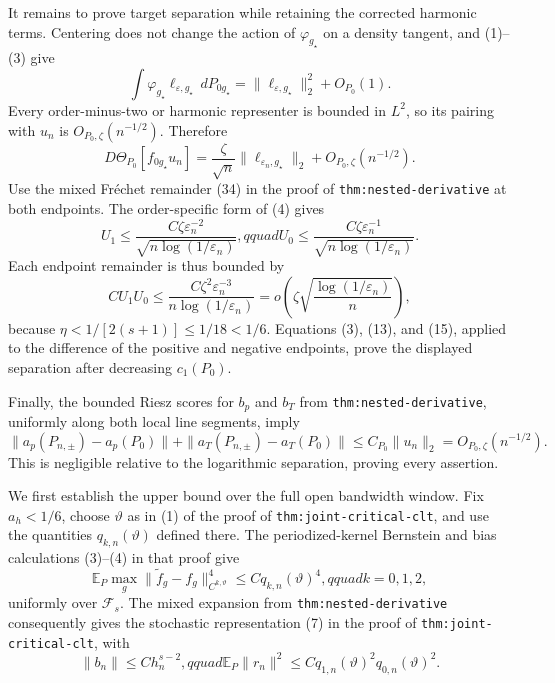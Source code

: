 It remains to prove target separation while retaining the corrected harmonic terms.  Centering does not change the action of \(\varphi_{g_\star}\) on a density tangent, and (1)--(3) give
\[
 \int\varphi_{g_\star}\ell_{\varepsilon,g_\star}\,dP_{0g_\star}
 =\|\ell_{\varepsilon,g_\star}\|_2^2+O_{P_0}(1).                    \tag{12}
\]
Every order-minus-two or harmonic representer is bounded in \(L^2\), so its pairing with \(u_n\) is \(O_{P_0,\zeta}(n^{-1/2})\).  Therefore
\[
 D\Theta_{P_0}[f_{0g_\star}u_n]
 =\frac{\zeta}{\sqrt n}\|\ell_{\varepsilon_n,g_\star}\|_2
 +O_{P_0,\zeta}(n^{-1/2}).                                             \tag{13}
\]
Use the mixed Fr\'echet remainder (34) in the proof of \texttt{thm:nested-derivative} at both endpoints.  The order-specific form of (4) gives
\[
 U_1\leq\frac{C\zeta\varepsilon_n^{-2}}
 {\sqrt{n\log(1/\varepsilon_n)}},qquad
 U_0\leq\frac{C\zeta\varepsilon_n^{-1}}
 {\sqrt{n\log(1/\varepsilon_n)}}.                                    \tag{14}
\]
Each endpoint remainder is thus bounded by
\[
 CU_1U_0\leq
 \frac{C\zeta^2\varepsilon_n^{-3}}
 {n\log(1/\varepsilon_n)}
 =o\!\left(\zeta\sqrt{\frac{\log(1/\varepsilon_n)}n}\right),        \tag{15}
\]
because \(\eta<1/[2(s+1)]\leq1/18<1/6\).  Equations (3), (13), and (15), applied to the difference of the positive and negative endpoints, prove the displayed separation after decreasing \(c_1(P_0)\).

Finally, the bounded Riesz scores for \(b_p\) and \(b_T\) from \texttt{thm:nested-derivative}, uniformly along both local line segments, imply
\[
 \|a_p(P_{n,\pm})-a_p(P_0)\|+
 \|a_T(P_{n,\pm})-a_T(P_0)\|
 \leq C_{P_0}\|u_n\|_2=O_{P_0,\zeta}(n^{-1/2}).                      \tag{16}
\]
This is negligible relative to the logarithmic separation, proving every assertion.

We first establish the upper bound over the full open bandwidth window.  Fix \(a_h<1/6\), choose \(\vartheta\) as in (1) of the proof of \texttt{thm:joint-critical-clt}, and use the quantities \(q_{k,n}(\vartheta)\) defined there.  The periodized-kernel Bernstein and bias calculations (3)--(4) in that proof give
\[
 \mathbb E_P\max_g\|\widetilde f_g-f_g\|_{C^{k,\vartheta}}^4
 \leq Cq_{k,n}(\vartheta)^4,qquad k=0,1,2,                           \tag{1}
\]
uniformly over \(\mathcal F_s\).  The mixed expansion from \texttt{thm:nested-derivative} consequently gives the stochastic representation (7) in the proof of \texttt{thm:joint-critical-clt}, with
\[
 \|b_n\|\leq Ch_n^{s-2},qquad
 \mathbb E_P\|r_n\|^2
 \leq Cq_{1,n}(\vartheta)^2q_{0,n}(\vartheta)^2.                     \tag{2}
\]

